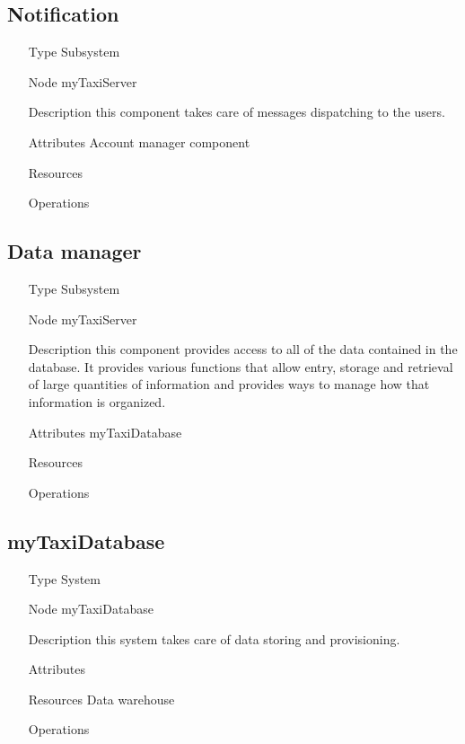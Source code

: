 \subsection{Notification}
\begin{itemize}
	\item[Type] Subsystem
	\item[Node] myTaxiServer
	\item[Description]  this component takes care of messages dispatching to the users.
	\item[Attributes] Account manager component
	\item[Resources] 
	\item[Operations]\begin{itemize}
		
	\end{itemize}
\end{itemize}

\subsection{Data manager}
\begin{itemize}
	\item[Type] Subsystem
	\item[Node] myTaxiServer
	\item[Description]  this component provides access to all of the data contained in the database. It provides various functions that allow entry, storage and retrieval of large quantities of information and provides ways to manage how that information is organized.
	\item[Attributes] myTaxiDatabase
	\item[Resources] 
	\item[Operations]\begin{itemize}
		
	\end{itemize}
\end{itemize}

\subsection{myTaxiDatabase}
\begin{itemize}
	\item[Type] System
	\item[Node] myTaxiDatabase
	\item[Description]  this system takes care of data storing and provisioning.
	\item[Attributes] 
	\item[Resources] Data warehouse
	\item[Operations]\begin{itemize}
		
	\end{itemize}
\end{itemize}